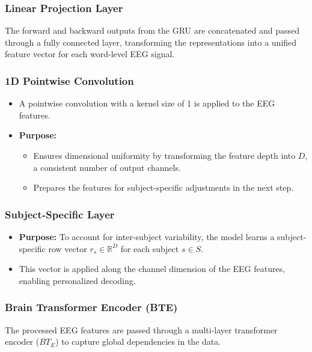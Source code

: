 \documentclass[journal]{IEEEtran}
\begin{document}
\subsubsection{Linear Projection Layer}
The forward and backward outputs from the GRU are concatenated and passed through a fully connected layer, transforming the representations into a unified feature vector for each word-level EEG signal.

\subsubsection{1D Pointwise Convolution}
\begin{itemize}
	\item A pointwise convolution with a kernel size of 1 is applied to the EEG features.
	\item \textbf{Purpose:}
	      \begin{itemize}
	      	\item Ensures dimensional uniformity by transforming the feature depth into \( D \), a consistent number of output channels.
	      	\item Prepares the features for subject-specific adjustments in the next step.
	      \end{itemize}
\end{itemize}

\subsubsection{Subject-Specific Layer}
\begin{itemize}
	\item \textbf{Purpose:} To account for inter-subject variability, the model learns a subject-specific row vector \( r_s \in \mathbb{R}^D \) for each subject \( s \in S \).
	\item This vector is applied along the channel dimension of the EEG features, enabling personalized decoding.
\end{itemize}


\subsubsection{Brain Transformer Encoder (BTE)}
The processed EEG features are passed through a multi-layer transformer encoder (\( BT_E \)) to capture global dependencies in the data.
\end{document}
